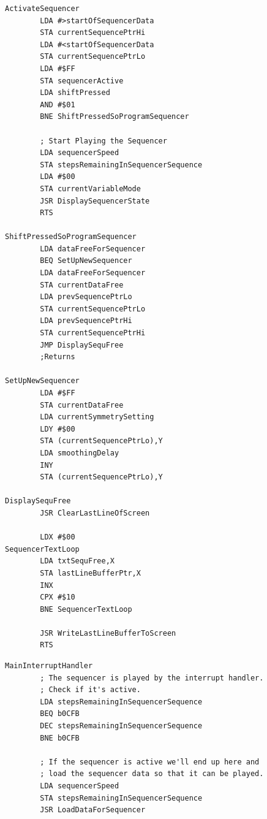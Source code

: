 \begin{lstlisting}[basicstyle=\ttfamily\tiny,caption=\icode{ActivateSequencer} displays the sequencer programming screen (\icode{ShiftPressedSoProgramSequencer}) or activates the sequencer\, depending on whether the user has pressed 'Shift' in combination with 'Q' or not.]
ActivateSequencer 
        LDA #>startOfSequencerData
        STA currentSequencePtrHi
        LDA #<startOfSequencerData
        STA currentSequencePtrLo
        LDA #$FF
        STA sequencerActive
        LDA shiftPressed
        AND #$01
        BNE ShiftPressedSoProgramSequencer

        ; Start Playing the Sequencer
        LDA sequencerSpeed
        STA stepsRemainingInSequencerSequence
        LDA #$00
        STA currentVariableMode
        JSR DisplaySequencerState
        RTS 

ShiftPressedSoProgramSequencer   
        LDA dataFreeForSequencer
        BEQ SetUpNewSequencer
        LDA dataFreeForSequencer
        STA currentDataFree
        LDA prevSequencePtrLo
        STA currentSequencePtrLo
        LDA prevSequencePtrHi
        STA currentSequencePtrHi
        JMP DisplaySequFree
        ;Returns

SetUpNewSequencer   
        LDA #$FF
        STA currentDataFree
        LDA currentSymmetrySetting
        LDY #$00
        STA (currentSequencePtrLo),Y
        LDA smoothingDelay
        INY 
        STA (currentSequencePtrLo),Y

DisplaySequFree    
        JSR ClearLastLineOfScreen

        LDX #$00
SequencerTextLoop   
        LDA txtSequFree,X
        STA lastLineBufferPtr,X
        INX 
        CPX #$10
        BNE SequencerTextLoop

        JSR WriteLastLineBufferToScreen
        RTS 
\end{lstlisting}

\begin{lstlisting}[caption=\icode{ActivateSequencer} displays the sequencer programming screen (\icode{ShiftPressedSoProgramSequencer}) or activates the sequencer\, depending on whether the user has pressed 'Shift' in combination with 'Q' or not.]
MainInterruptHandler
        ; The sequencer is played by the interrupt handler.
        ; Check if it's active.
        LDA stepsRemainingInSequencerSequence
        BEQ b0CFB
        DEC stepsRemainingInSequencerSequence
        BNE b0CFB

        ; If the sequencer is active we'll end up here and
        ; load the sequencer data so that it can be played.
        LDA sequencerSpeed
        STA stepsRemainingInSequencerSequence
        JSR LoadDataForSequencer
\end{lstlisting}

